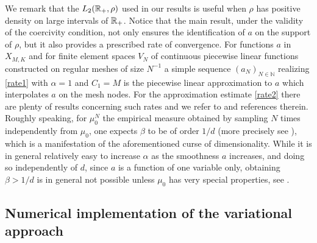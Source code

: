 We  remark that the $L_2(\mathbb{R}_+,\rho)$ used in our results is useful when $\rho$ has positive density on large intervals of $\mathbb{R}_+$.
Notice that the main result, under the validity of the coercivity condition, not only ensures the identification of $a$ on the support of $\rho$, but it also provides a prescribed rate of convergence.
For functions $a$ in $X_{M,K}$ and for finite element spaces $V_N$ of continuous piecewise linear functions constructed on regular meshes of size $N^{-1}$ a simple sequence $(a_N)_{N \in \mathbb N}$  realizing \eqref{rate1} with $\alpha=1$ and $C_1=M$ is the piecewise linear approximation to $a$ which interpolates $a$ on the mesh nodes. For the approximation estimate \eqref{rate2} there are plenty of results
concerning such rates and we refer to \cite{descsc13} and references therein. Roughly speaking, for $\mu_0^N$ the empirical measure obtained by sampling $N$ times independently from $\mu_0$, one expects $\beta$ to be of order $1/d$ (more precisely see \cite[Theorem 1]{descsc13}), which is a manifestation of the aforementioned curse of dimensionality. While it is in general relatively easy to increase $\alpha$ as the smoothness $a$ increases, and doing so independently of $d$, since $a$ is a function of one variable only, obtaining $\beta>1/d$ is in general not possible unless $\mu_0$ has very special properties, see \cite[Section 4.4 and Section 4.5]{fohavy11}.



\subsection{Numerical implementation of the variational approach }\label{sec:wp3}


